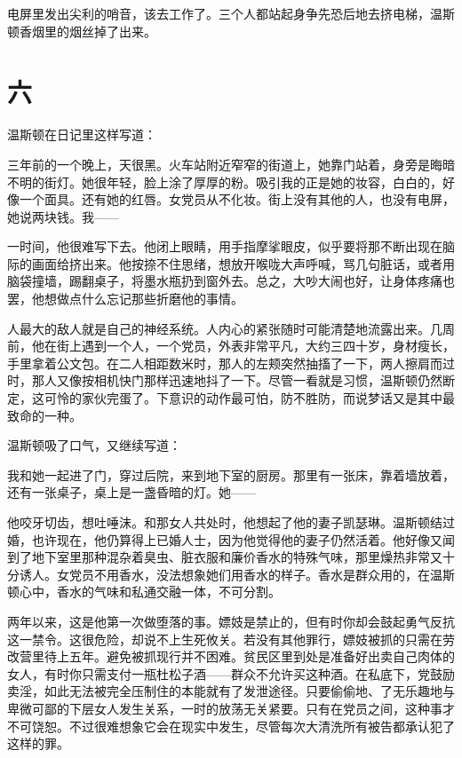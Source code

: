 电屏里发出尖利的哨音，该去工作了。三个人都站起身争先恐后地去挤电梯，温斯顿香烟里的烟丝掉了出来。

\section*{六}\label{ux516d}

温斯顿在日记里这样写道：

三年前的一个晚上，天很黑。火车站附近窄窄的街道上，她靠门站着，身旁是晦暗不明的街灯。她很年轻，脸上涂了厚厚的粉。吸引我的正是她的妆容，白白的，好像一个面具。还有她的红唇。女党员从不化妆。街上没有其他的人，也没有电屏，她说两块钱。我——

一时间，他很难写下去。他闭上眼睛，用手指摩挲眼皮，似乎要将那不断出现在脑际的画面给挤出来。他按捺不住思绪，想放开喉咙大声呼喊，骂几句脏话，或者用脑袋撞墙，踢翻桌子，将墨水瓶扔到窗外去。总之，大吵大闹也好，让身体疼痛也罢，他想做点什么忘记那些折磨他的事情。

人最大的敌人就是自己的神经系统。人内心的紧张随时可能清楚地流露出来。几周前，他在街上遇到一个人，一个党员，外表非常平凡，大约三四十岁，身材瘦长，手里拿着公文包。在二人相距数米时，那人的左颊突然抽搐了一下，两人擦肩而过时，那人又像按相机快门那样迅速地抖了一下。尽管一看就是习惯，温斯顿仍然断定，这可怜的家伙完蛋了。下意识的动作最可怕，防不胜防，而说梦话又是其中最致命的一种。

温斯顿吸了口气，又继续写道：

我和她一起进了门，穿过后院，来到地下室的厨房。那里有一张床，靠着墙放着，还有一张桌子，桌上是一盏昏暗的灯。她——

他咬牙切齿，想吐唾沫。和那女人共处时，他想起了他的妻子凯瑟琳。温斯顿结过婚，也许现在，他仍算得上已婚人士，因为他觉得他的妻子仍然活着。他好像又闻到了地下室里那种混杂着臭虫、脏衣服和廉价香水的特殊气味，那里燥热非常又十分诱人。女党员不用香水，没法想象她们用香水的样子。香水是群众用的，在温斯顿心中，香水的气味和私通交融一体，不可分割。

两年以来，这是他第一次做堕落的事。嫖妓是禁止的，但有时你却会鼓起勇气反抗这一禁令。这很危险，却说不上生死攸关。若没有其他罪行，嫖妓被抓的只需在劳改营里待上五年。避免被抓现行并不困难。贫民区里到处是准备好出卖自己肉体的女人，有时你只需支付一瓶杜松子酒——群众不允许买这种酒。在私底下，党鼓励卖淫，如此无法被完全压制住的本能就有了发泄途径。只要偷偷地、了无乐趣地与卑微可鄙的下层女人发生关系，一时的放荡无关紧要。只有在党员之间，这种事才不可饶恕。不过很难想象它会在现实中发生，尽管每次大清洗所有被告都承认犯了这样的罪。

